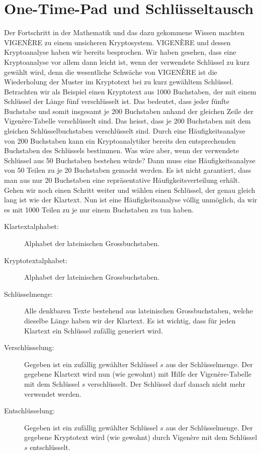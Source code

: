 \chapter{One-Time-Pad und Schlüsseltausch}\label{ch:02}
Der Fortschritt in der Mathematik und das dazu gekommene Wissen machten VIGENÈRE zu einem unsicheren Kryptosystem.
VIGENÈRE und dessen Kryptoanalyse haben wir bereits besprochen. Wir haben gesehen, dass eine Kryptoanalyse vor allem dann leicht ist,
wenn der verwendete Schlüssel zu kurz gewählt wird, denn die wesentliche Schwäche
von VIGENÈRE ist die Wiederholung der Muster im Kryptotext bei zu kurz gewähltem
Schlüssel. Betrachten wir als Beispiel einen Kryptotext aus 1000 Buchstaben, der mit einem Schlüssel der Länge fünf verschlüsselt ist. Das bedeutet, dass jeder fünfte Buchstabe und somit insgesamt je 200 Buchstaben anhand der gleichen Zeile der Vigenère-Tabelle
verschlüsselt sind. Das heisst, dass je 200 Buchstaben mit dem gleichen Schlüsselbuchstaben verschlüsselt sind. Durch eine Häufigkeitsanalyse von 200 Buchstaben kann ein
Kryptoanalytiker bereits den entsprechenden Buchstaben des Schlüssels bestimmen.
Was wäre aber, wenn der verwendete Schlüssel aus 50 Buchstaben bestehen würde?
Dann muss eine Häufigkeitsanalyse von 50 Teilen zu je 20 Buchstaben gemacht werden.
Es ist nicht garantiert, dass man aus nur 20 Buchstaben eine repräsentative Häufigkeitsverteilung erhält. Gehen wir noch einen Schritt weiter und wählen einen Schlüssel, der
genau gleich lang ist wie der Klartext. Nun ist eine Häufigkeitsanalyse völlig unmöglich,
da wir es mit 1000 Teilen zu je nur einem Buchstaben zu tun haben.

\begin{myprocedure}\label{myprocedure:onetime}
	\phantom{1}
	\begin{description}
		\item[Klartextalphabet:] Alphabet der lateinischen Grossbuchstaben.
		\item[Kryptotextalphabet:] Alphabet der lateinischen Grossbuchstaben.
		\item[Schlüsselmenge:] Alle denkbaren Texte bestehend aus lateinischen Grossbuchstaben, welche dieselbe Länge haben wir der Klartext. Es ist wichtig, dass für jeden Klartext ein Schlüssel zufällig generiert wird.
		\item[Verschlüsselung:] Gegeben ist ein zufällig gewählter Schlüssel $s$ aus der Schlüsselmenge. Der gegebene Klartext wird nun (wie gewohnt) mit Hilfe der Vigenère-Tabelle mit dem Schlüssel $s$ verschlüsselt. Der Schlüssel darf danach nicht mehr verwendet werden.
		\item[Entschlüsselung:] Gegeben ist ein zufällig gewählter Schlüssel $s$ aus der Schlüsselmenge. Der gegebene Kryptotext wird (wie gewohnt) durch Vigenère mit dem Schlüssel $s$ entschlüsselt.
	\end{description}
\end{myprocedure}


